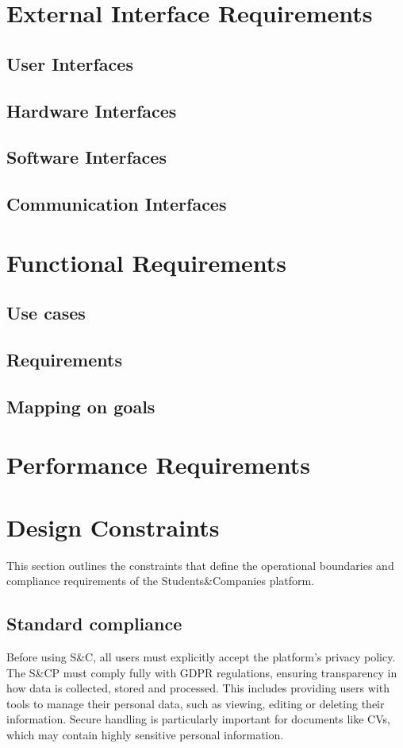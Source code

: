 \section{External Interface Requirements}
\subsection{User Interfaces}
\subsection{Hardware Interfaces}
\subsection{Software Interfaces}
\subsection{Communication Interfaces}
\section{Functional Requirements}
\subsection{Use cases}
\subsection{Requirements}
\subsection{Mapping on goals}
\section{Performance Requirements}
\section{Design Constraints}
This section outlines the constraints that define the operational boundaries and compliance requirements of the Students\&Companies platform.

\subsection{Standard compliance}
Before using S\&C, all users must explicitly accept the platform's privacy policy.
The S\&CP must comply fully with GDPR regulations, ensuring transparency in how data is collected, stored and processed.
This includes providing users with tools to manage their personal data, such as viewing, editing or deleting their information.
Secure handling is particularly important for documents like CVs, which may contain highly sensitive personal information.

